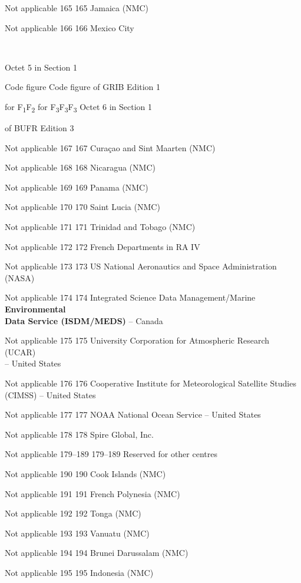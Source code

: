 Not applicable 165 165 Jamaica (NMC)

Not applicable 166 166 Mexico City

\textbf{\\
}

Octet 5 in Section 1

Code figure Code figure of GRIB Edition 1

for F\textsubscript{1}F\textsubscript{2} for F\textsubscript{3}F\textsubscript{3}F\textsubscript{3} Octet 6 in Section 1

of BUFR Edition 3

Not applicable 167 167 Curaçao and Sint Maarten (NMC)

Not applicable 168 168 Nicaragua (NMC)

Not applicable 169 169 Panama (NMC)

Not applicable 170 170 Saint Lucia (NMC)

Not applicable 171 171 Trinidad and Tobago (NMC)

Not applicable 172 172 French Departments in RA IV

Not applicable 173 173 US National Aeronautics and Space Administration (NASA)

Not applicable 174 174 Integrated Science Data Management/Marine \textbf{Environmental\\
Data Service (ISDM/MEDS)} -- Canada

Not applicable 175 175 University Corporation for Atmospheric Research (UCAR)\\
-- United States

Not applicable 176 176 Cooperative Institute for Meteorological Satellite Studies\\
(CIMSS) -- United States

Not applicable 177 177 NOAA National Ocean Service -- United States

Not applicable 178 178 Spire Global, Inc.

Not applicable 179--189 179--189 Reserved for other centres

Not applicable 190 190 Cook Islands (NMC)

Not applicable 191 191 French Polynesia (NMC)

Not applicable 192 192 Tonga (NMC)

Not applicable 193 193 Vanuatu (NMC)

Not applicable 194 194 Brunei Darussalam (NMC)

Not applicable 195 195 Indonesia (NMC)

